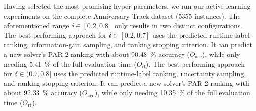 \documentclass[runningheads]{llncs}
\begin{document}
Having selected the most promising hyper-parameters, we run our active-learning experiments on the complete Anniversary Track dataset (5355 instances).
The aforementioned range $\delta \in \left[0.2, 0.8\right]$ only results in two distinct configurations.
The best-performing approach for $\delta \in \left[0.2, 0.7\right]$ uses the predicted runtime-label ranking, information-gain sampling, and ranking stopping criterion.
It can predict a new solver's PAR-2 ranking with about \SI{90.48}{\%} accuracy ($O_{\operatorname{acc}}$), while only needing \SI{5.41}{\%} of the full evaluation time ($O_{\operatorname{rt}}$).
The best-performing approach for $\delta \in (0.7, 0.8]$ uses the predicted runtime-label ranking, uncertainty sampling, and ranking stopping criterion.
It can predict a new solver's PAR-2 ranking with about \SI{92.33}{\%} accuracy ($O_{\operatorname{acc}}$), while only needing \SI{10.35}{\%} of the full evaluation time ($O_{\operatorname{rt}}$).
\end{document}
